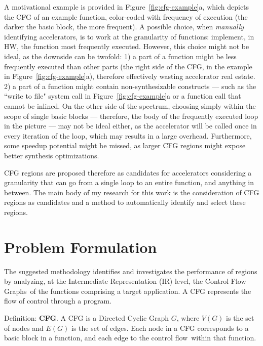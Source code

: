\documentclass[]{usiinfthesis}
\newcommand{\controlflow}{control flow}
\newcommand{\CFGs}{Control Flow Graphs}
\begin{document}
A motivational example is provided in Figure~\ref{fig:cfg-example}a,
which depicts the CFG of an example function, color-coded with
frequency of execution (the darker the basic block, the more
frequent). A possible choice, when \emph{manually} identifying
accelerators, is to work at the granularity of functions: implement,
in HW, the function most frequently executed. However, this choice
might not be ideal, as the downside can be twofold: 1) a part of a
function might be less frequently executed than other parts (the right
side of the CFG, in the example in Figure~\ref{fig:cfg-example}a),
therefore effectively wasting accelerator real estate. 2) a part of a
function might contain non-synthesizable constructs --- such as the
``write to file" system call in Figure~\ref{fig:cfg-example}a or a function 
call that cannot be inlined.  On the
other side of the spectrum, choosing simply within the scope of single
basic blocks --- therefore, the body of the frequently executed loop
in the picture --- may not be ideal either, as the accelerator will be
called once in every iteration of the loop, which may results in a
large overhead. Furthermore, some speedup potential might be missed,
as larger CFG regions might expose better synthesis optimizations.\par

CFG regions are proposed therefore as candidates for
accelerators considering a granularity that can go from a
single loop to an entire function, and anything in between. 
The main body of my research for this work is the consideration 
of CFG regions as candidates and a method to 
automatically identify and select these regions.

%
%
%
%
%
%
%

\section{Problem Formulation}
\label{sec:prob}

The suggested methodology identifies and investigates the performance of regions
by analyzing, at the Intermediate Representation (IR) level, the
\CFGs\ of the functions comprising a target application. A CFG
represents the flow of control through a program.\par

Definition: \textbf{CFG}. A CFG is a Directed Cyclic Graph $G$, where
$V(G)$ is the set of nodes and $E(G)$ is the set of edges. Each node
in a CFG corresponds to a basic block in a function, and each edge to
the \controlflow\ within that function.\par
\end{document}
